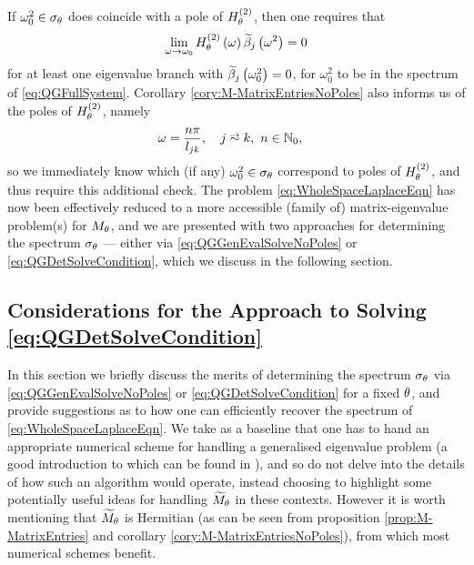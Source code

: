If $\omega_0^2\in\sigma_\theta$ does coincide with a pole of $H_\theta^{(2)}$, then one requires that 
\begin{align*}
	\lim_{\omega\rightarrow\omega_0}H_\theta^{(2)}\left( \omega \right)\widetilde{\beta}_j\left( \omega^2 \right) = 0
\end{align*}
 for at least one eigenvalue branch with $\widetilde{\beta}_j\left( \omega_0^2 \right)=0$, for $\omega_0^2$ to be in the spectrum of \eqref{eq:QGFullSystem}.
Corollary \ref{cory:M-MatrixEntriesNoPoles} also informs us of the poles of $H_\theta^{(2)}$, namely 
\begin{align*}
	\omega &= \frac{n\pi}{l_{jk}}, \quad j\conLeft k, \ n\in\naturals_{0},
\end{align*}
so we immediately know which (if any) $\omega_0^2\in\sigma_\theta$ correspond to poles of $H_\theta^{(2)}$, and thus require this additional check.
The problem \eqref{eq:WholeSpaceLaplaceEqn} has now been effectively reduced to a more accessible (family of) matrix-eigenvalue problem(s) for $M_\theta$, and we are presented with two approaches for determining the spectrum $\sigma_\theta$ --- either via \eqref{eq:QGGenEvalSolveNoPoles} or \eqref{eq:QGDetSolveCondition}, which we discuss in the following section.

\subsection{Considerations for the Approach to Solving \eqref{eq:QGDetSolveCondition}} \label{ssec:ApproachConsiderations}
In this section we briefly discuss the merits of determining the spectrum $\sigma_\theta$ via \eqref{eq:QGGenEvalSolveNoPoles} or \eqref{eq:QGDetSolveCondition} for a fixed $\theta$, and provide suggestions as to how one can efficiently recover the spectrum of \eqref{eq:WholeSpaceLaplaceEqn}.
We take as a baseline that one has to hand an appropriate numerical scheme for handling a generalised eigenvalue problem (a good introduction to which can be found in \cite{guttel2017nonlinear}), and so do not delve into the details of how such an algorithm would operate, instead choosing to highlight some potentially useful ideas for handling $\widetilde{M}_\theta$ in these contexts.
However it is worth mentioning that $\widetilde{M}_\theta$ is Hermitian (as can be seen from proposition \ref{prop:M-MatrixEntries} and corollary \ref{cory:M-MatrixEntriesNoPoles}), from which most numerical schemes benefit.

